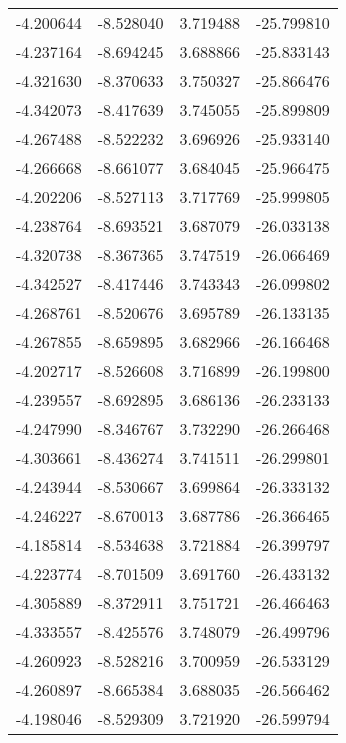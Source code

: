 \begin{tabular}{rrrr}
       -4.200644 &        -8.528040 &    3.719488 & -25.799810 \\
       -4.237164 &        -8.694245 &    3.688866 & -25.833143 \\
       -4.321630 &        -8.370633 &    3.750327 & -25.866476 \\
       -4.342073 &        -8.417639 &    3.745055 & -25.899809 \\
       -4.267488 &        -8.522232 &    3.696926 & -25.933140 \\
       -4.266668 &        -8.661077 &    3.684045 & -25.966475 \\
       -4.202206 &        -8.527113 &    3.717769 & -25.999805 \\
       -4.238764 &        -8.693521 &    3.687079 & -26.033138 \\
       -4.320738 &        -8.367365 &    3.747519 & -26.066469 \\
       -4.342527 &        -8.417446 &    3.743343 & -26.099802 \\
       -4.268761 &        -8.520676 &    3.695789 & -26.133135 \\
       -4.267855 &        -8.659895 &    3.682966 & -26.166468 \\
       -4.202717 &        -8.526608 &    3.716899 & -26.199800 \\
       -4.239557 &        -8.692895 &    3.686136 & -26.233133 \\
       -4.247990 &        -8.346767 &    3.732290 & -26.266468 \\
       -4.303661 &        -8.436274 &    3.741511 & -26.299801 \\
       -4.243944 &        -8.530667 &    3.699864 & -26.333132 \\
       -4.246227 &        -8.670013 &    3.687786 & -26.366465 \\
       -4.185814 &        -8.534638 &    3.721884 & -26.399797 \\
       -4.223774 &        -8.701509 &    3.691760 & -26.433132 \\
       -4.305889 &        -8.372911 &    3.751721 & -26.466463 \\
       -4.333557 &        -8.425576 &    3.748079 & -26.499796 \\
       -4.260923 &        -8.528216 &    3.700959 & -26.533129 \\
       -4.260897 &        -8.665384 &    3.688035 & -26.566462 \\
       -4.198046 &        -8.529309 &    3.721920 & -26.599794 \\

\end{tabular}
